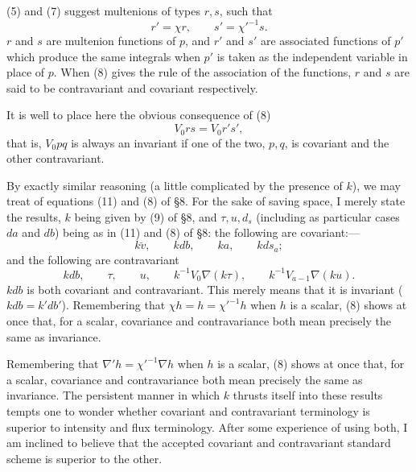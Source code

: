 \documentclass[11pt]{article}
\begin{document}
(5) and (7) suggest multenions of types $r,s$, such that
\begin{equation}r'=\chi r,\qquad s'=\chi'^{-1}s.\tag{8}\end{equation}
$r$ and $s$ are multenion functions of $p$, and $r'$ and $s'$ are associated functions of $p'$ which produce the same integrals when $p'$ is taken as the independent variable in place of $p$. When (8) gives the rule of the association of the functions, $r$ and $s$ are said to be contravariant and covariant respectively.

\indent It is well to place here the obvious consequence of (8)
\begin{equation}V_0rs=V_0r's',\tag{9}\end{equation}
that is, $V_0pq$ is always an invariant if one of the two, $p,q$, is covariant and the other contravariant.

\indent By exactly similar reasoning (a little complicated by the presence of $k$), we may treat of equations (11) and (8) of §8. For the sake of saving space, I merely state the results, $k$ being given by (9) of §8, and $\tau,u,d_s$ (including as particular cases $da$ and $db$) being as in (11) and (8) of §8: the following are covariant:---
\[k\breve v,\qquad kdb,\qquad ka,\qquad kds_a;\]
and the following are contravariant
\[kdb,\qquad \tau,\qquad u,\qquad k^{-1}V_0\nabla(k\tau),\qquad k^{-1}V_{a-1}\nabla(ku).\]
$kdb$ is both covariant and contravariant. This merely means that it is invariant ($kdb=k'db'$). Remembering that $\chi h=h=\chi'^{-1}h$ when $h$ is a scalar, (8) shows at once that, for a scalar, covariance and contravariance both mean precisely the same as invariance.

\indent Remembering that $\nabla'h=\chi'^{-1}\nabla h$ when $h$ is a scalar, (8) shows at once that, for a scalar, covariance and contravariance both mean precisely the same as invariance. The persistent manner in which $k$ thrusts itself into these results tempts one to wonder whether covariant and contravariant terminology is superior to intensity and flux terminology. After some experience of using both, I am inclined to believe that the accepted covariant and contravariant standard scheme is superior to the other.
\end{document}
